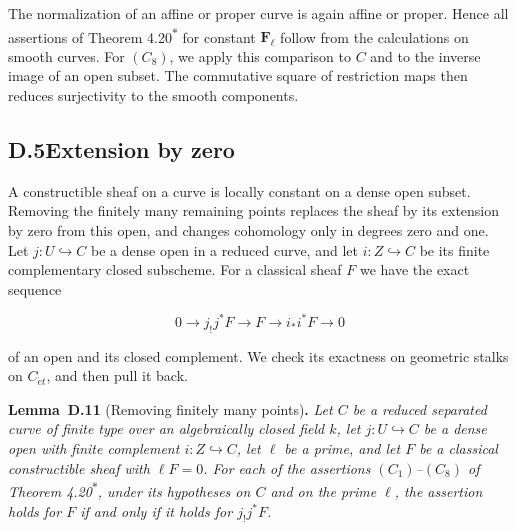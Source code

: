 \documentclass[11pt]{article}
\newenvironment{bpstatement}[2]{\par\addvspace{0.6\baselineskip}\noindent\textbf{#1}#2\textbf{.}\enspace\ignorespaces}
  {\par\addvspace{0.4\baselineskip}}
\newenvironment{bpstatementit}[2]{\begin{bpstatement}{#1}{#2}\itshape\ignorespaces}{\end{bpstatement}}
\newcommand{\bpout}[1]{#1\textsuperscript{\hyperlink{bp-outside}{\ensuremath{\ast}}}}
\begin{document}
The normalization of an affine or proper curve is again affine or proper. Hence all assertions of Theorem \bpout{4.20} for constant \(\mathbf F_\ell\) follow from the calculations on smooth curves. For \((C_8)\), we apply this comparison to \(C\) and to the inverse image of an open subset. The commutative square of restriction maps then reduces surjectivity to the smooth components.


\subsection*{\texorpdfstring{D.5\quad Extension by zero}{D.5 Extension by zero}}
\label{bp37}%
\label{bp38}%
A constructible sheaf on a curve is locally constant on a dense open subset. Removing the finitely many remaining points replaces the sheaf by its extension by zero from this open, and changes cohomology only in degrees zero and one. Let \(j:U\hookrightarrow C\) be a dense open in a reduced curve, and let \(i:Z\hookrightarrow C\) be its finite complementary closed subscheme. For a classical sheaf \(F\) we have the exact sequence

\[
0\longrightarrow j_!j^*F\longrightarrow F
\longrightarrow i_*i^*F\longrightarrow0
\]

of an open and its closed complement. We check its exactness on geometric stalks on \(C_{\acute{e}t}\), and then pull it back.

\label{bp39}%
\begin{bpstatementit}{Lemma~D.11}{ (Removing finitely many points)}
Let \(C\) be a reduced separated curve of finite type over an algebraically closed field \(k\), let \(j:U\hookrightarrow C\) be a dense open with finite complement \(i:Z\hookrightarrow C\), let \(\ell\) be a prime, and let \(F\) be a classical constructible sheaf with \(\ell F=0\). For each of the assertions \((C_1)\)–\((C_8)\) of Theorem \bpout{4.20}, under its hypotheses on \(C\) and on the prime \(\ell\), the assertion holds for \(F\) if and only if it holds for \(j_!j^*F\).
\end{bpstatementit}
\end{document}
